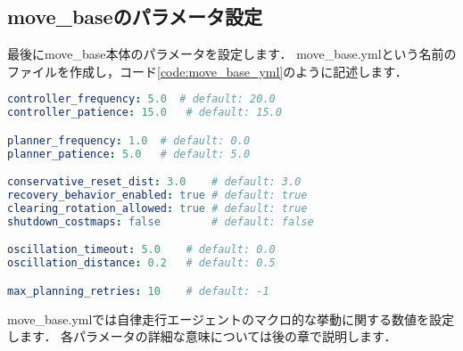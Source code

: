 \documentclass[{../../master}]{subfiles}
\begin{document}
\subsection{\textsf{move\_base}のパラメータ設定}

最後に\textsf{move\_base}本体のパラメータを設定します．
\textsf{move\_base.yml}という名前のファイルを作成し，コード\ref{code:move_base_yml}のように記述します．

\begin{lstlisting}[language=YAML, label=code:move_base_yml, caption=\textsf{move\_base.yml}]
controller_frequency: 5.0  # default: 20.0
controller_patience: 15.0   # default: 15.0

planner_frequency: 1.0  # default: 0.0
planner_patience: 5.0   # default: 5.0

conservative_reset_dist: 3.0    # default: 3.0
recovery_behavior_enabled: true # default: true
clearing_rotation_allowed: true # default: true
shutdown_costmaps: false        # default: false

oscillation_timeout: 5.0    # default: 0.0
oscillation_distance: 0.2   # default: 0.5

max_planning_retries: 10    # default: -1
\end{lstlisting}

\textsf{move\_base.yml}では自律走行エージェントのマクロ的な挙動に関する数値を設定します．
各パラメータの詳細な意味については後の章で説明します．
\end{document}
